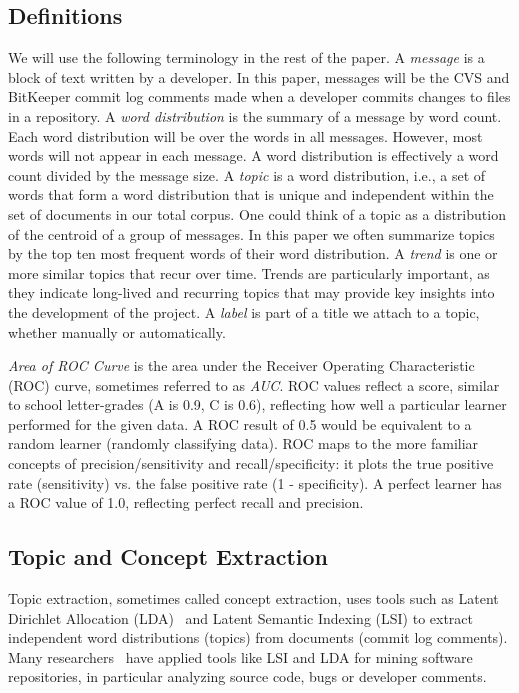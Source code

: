 \documentclass{acm_proc_article-sp}
\begin{document}
\subsection{Definitions}
We will use the following terminology in the rest of the paper.
A \emph{message} is a block of text written by a developer. In this
paper, messages will be the CVS and BitKeeper commit log comments made
when a developer commits changes to files in a repository. A \emph{word
  distribution} is the summary of a message by word count. Each word
distribution will be over the words in all messages. However, most
words will not appear in each message. A word distribution is effectively
a word count divided by the message size. A \emph{topic} is a word
distribution, i.e., a set of words that form a word distribution that is
unique and independent within the set of documents in our total
corpus. One could think of a topic as a distribution of the centroid
of a group of messages. In this paper we often summarize topics by the
top ten most frequent words of their word distribution.  A \emph{trend}
is one or more similar topics that recur over time.  Trends are
particularly important, as they indicate long-lived and recurring
topics that may provide key insights into the development of the
project. A \emph{label} is part of a title we attach to a topic, whether manually or automatically.

\emph{Area of ROC Curve} is the area under the Receiver Operating Characteristic (ROC) curve, sometimes referred to as \emph{AUC}. ROC values reflect a score, similar to school letter-grades (A is 0.9, C is 0.6), reflecting how well a particular learner performed for the given data. A ROC result of 0.5 would be equivalent to a random learner (randomly classifying data). ROC maps to the more familiar concepts of precision/sensitivity and recall/specificity: it plots the true positive rate (sensitivity) vs. the false positive rate (1 - specificity). A perfect learner has a ROC value of 1.0, reflecting perfect recall and precision.


\subsection{Topic and Concept Extraction}
Topic extraction, sometimes called concept extraction, uses tools such as Latent Dirichlet Allocation (LDA)~\cite{Blei2003} and Latent Semantic Indexing (LSI) to extract
independent word distributions (topics) from
	documents (commit log comments). Many researchers~\cite{marcus04wcre,Poshyvanyk2007,lukins08wcre,Linstead2007} have applied tools like LSI and LDA for mining software repositories, in particular analyzing source code, bugs or developer comments.

\end{document}
